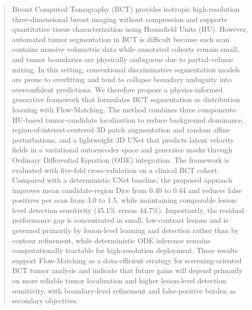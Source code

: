 \documentclass{iopjournal}
\begin{document}
\begin{abstract}
    Breast Computed Tomography (BCT) provides isotropic high-resolution three-dimensional breast imaging without compression and supports quantitative tissue characterization using Hounsfield Units (HU). However, automated tumor segmentation in BCT is difficult because each scan contains massive volumetric data while annotated cohorts remain small, and tumor boundaries are physically ambiguous due to partial-volume mixing. In this setting, conventional discriminative segmentation models are prone to overfitting and tend to collapse boundary ambiguity into overconfident predictions. We therefore propose a physics-informed generative framework that formulates BCT segmentation as distribution learning with Flow-Matching. The method combines three components: HU-based tumor-candidate localization to reduce background dominance, region-of-interest-centered 3D patch augmentation and random affine perturbations, and a lightweight 3D UNet that predicts latent velocity fields in a variational autoencoder space and generates masks through Ordinary Differential Equation (ODE) integration. The framework is evaluated with five-fold cross-validation on a clinical BCT cohort. Compared with a deterministic UNet baseline, the proposed approach improves mean candidate-region Dice from 0.40 to 0.44 and reduces false positives per scan from 3.0 to 1.5, while maintaining comparable lesion-level detection sensitivity (45.1\% versus 44.7\%). Importantly, the residual performance gap is concentrated in small, low-contrast lesions and is governed primarily by lesion-level learning and detection rather than by contour refinement, while deterministic ODE inference remains computationally tractable for high-resolution deployment. These results support Flow-Matching as a data-efficient strategy for screening-oriented BCT tumor analysis and indicate that future gains will depend primarily on more reliable tumor localization and higher lesion-level detection sensitivity, with boundary-level refinement and false-positive burden as secondary objectives.
\end{abstract}
\end{document}
